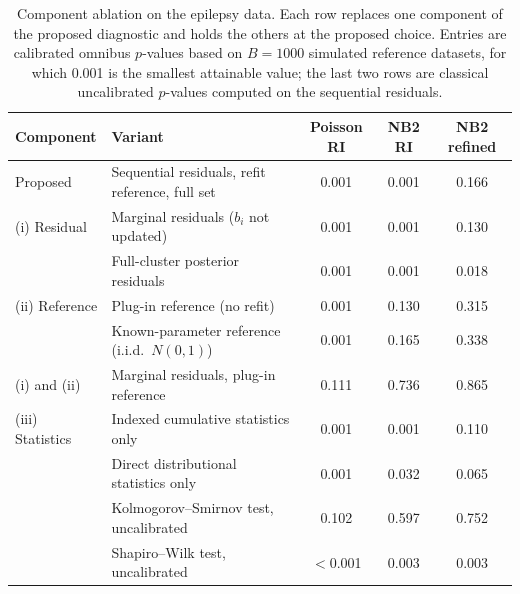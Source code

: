 \begin{table}[htbp]
\centering
\small
\caption{Component ablation on the epilepsy data. Each row replaces one component of the proposed diagnostic and holds the others at the proposed choice. Entries are calibrated omnibus $p$-values based on $B=1000$ simulated reference datasets, for which 0.001 is the smallest attainable value; the last two rows are classical uncalibrated $p$-values computed on the sequential residuals.}
\label{tab:ablation-epil}
\begin{tabular*}{\textwidth}{@{}ll@{\extracolsep{\fill}}ccc@{}}
\toprule
Component & Variant & Poisson RI & NB2 RI & NB2 refined \\
\midrule
Proposed & Sequential residuals, refit reference, full set & 0.001 & 0.001 & 0.166 \\
\midrule
(i) Residual & Marginal residuals ($b_i$ not updated) & 0.001 & 0.001 & 0.130 \\
 & Full-cluster posterior residuals & 0.001 & 0.001 & 0.018 \\
\midrule
(ii) Reference & Plug-in reference (no refit) & 0.001 & 0.130 & 0.315 \\
 & Known-parameter reference (i.i.d.\ $N(0,1)$) & 0.001 & 0.165 & 0.338 \\
\midrule
(i) and (ii) & Marginal residuals, plug-in reference & 0.111 & 0.736 & 0.865 \\
\midrule
(iii) Statistics & Indexed cumulative statistics only & 0.001 & 0.001 & 0.110 \\
 & Direct distributional statistics only & 0.001 & 0.032 & 0.065 \\
 & Kolmogorov--Smirnov test, uncalibrated & 0.102 & 0.597 & 0.752 \\
 & Shapiro--Wilk test, uncalibrated & $<$0.001 & 0.003 & 0.003 \\
\bottomrule
\end{tabular*}
\end{table}
